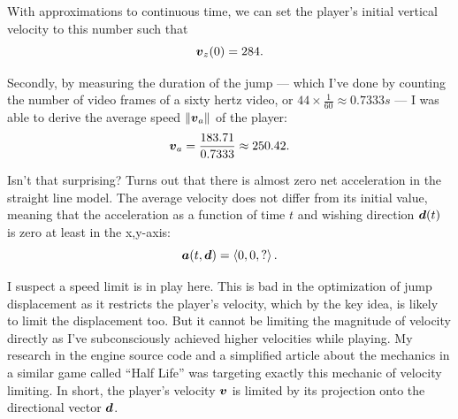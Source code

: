 With approximations to continuous time, we can set the player's initial vertical velocity to this number such that
\[
    \boldsymbol{v}_{z}(0) = 284.
\]


Secondly, by measuring the duration of the jump --- which I've done by counting the number of video frames of a sixty hertz video, or $44 \times \frac{1}{60} \approx 0.7333 \si{s}$ --- I was able to derive the average speed $\|\boldsymbol{v}_{a}\|$ of the player:
\[
    \boldsymbol{v}_{a} = \frac{183.71}{0.7333} \approx 250.42.
\]

Isn't that surprising? Turns out that there is almost zero net acceleration in the straight line model. The average velocity does not differ from its initial value, meaning that the acceleration as a function of time $t$ and wishing direction $\boldsymbol{d}(t)$ is zero at least in the x,y-axis:
\[
    \boldsymbol{a}(t, \boldsymbol{d}) = \left\langle 0, 0, ? \right\rangle.
\]

I suspect a speed limit is in play here. This is bad in the optimization of jump displacement as it restricts the player's velocity, which by the key idea, is likely to limit the displacement too. But it cannot be limiting the magnitude of velocity directly as I've subconsciously achieved higher velocities while playing. My research in the engine source code \parencite{valvesoftware} and a simplified article about the mechanics in a similar game called ``Half Life'' \parencite{jwchong} was targeting exactly this mechanic of velocity limiting. In short, the player's velocity $\boldsymbol{v}$ is limited by its projection onto the directional vector $\boldsymbol{d}$.

